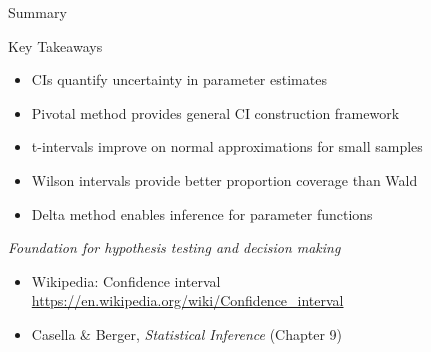 \begin{frame}{Summary}
  \begin{block}{Key Takeaways}
    \begin{itemize}
      \item CIs quantify uncertainty in parameter estimates
      \item Pivotal method provides general CI construction framework
      \item t-intervals improve on normal approximations for small samples
      \item Wilson intervals provide better proportion coverage than Wald
      \item Delta method enables inference for parameter functions
    \end{itemize}
  \end{block}

  \begin{center}
    \textit{Foundation for hypothesis testing and decision making}
  \end{center}

  \footnotesize
  \begin{itemize}
    \item Wikipedia: Confidence interval \url{https://en.wikipedia.org/wiki/Confidence_interval}
    \item Casella \& Berger, \textit{Statistical Inference} (Chapter 9)
  \end{itemize}
\end{frame}